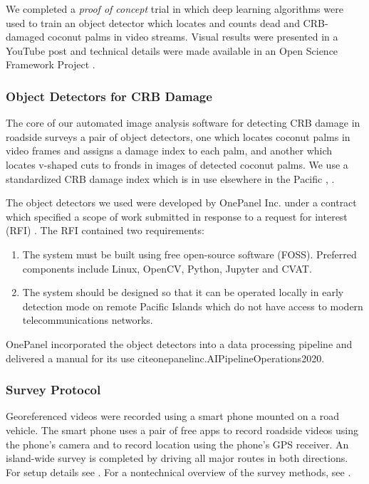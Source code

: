 \documentclass[12pt,letterpaper,english,bibliography=totocnumbered,abstract=on]{scrartcl}
\begin{document}
We completed a \textit{proof of concept} trial in which deep learning algorithms were used to train an object detector which locates and counts dead and CRB-damaged coconut palms in video streams.  Visual results were presented in a YouTube post \parencite{moore_training_2019} and technical details were made available in an Open Science Framework Project \parencite{moore_open_2019}.

\subsubsection{Object Detectors for CRB Damage}

The core of our automated image analysis software for detecting CRB damage in roadside surveys a pair of object detectors, one which locates coconut palms in video frames and assigns a damage index to each palm, and another which locates v-shaped cuts to fronds in images of detected coconut palms. We use a standardized CRB damage index which is in use elsewhere in the Pacific \cite{jackson_rhinoceros_2019-1}, \cite{vaqalo_coconut_2017}.

The object detectors we used were developed by OnePanel Inc. under a contract which specified a scope of work \cite{onepanelinc.ScopeWorkObject2020} submitted in response to a request for interest (RFI) \cite{mooreRequestInterestObject2020}. The RFI contained two requirements:
\begin{enumerate}
	\item The system must be built using free open-source software (FOSS). Preferred components include Linux, OpenCV, Python, Jupyter and CVAT.
	\item The system should be designed so that it can be operated locally in early detection
	mode on remote Pacific Islands which do not have access to modern telecommunications networks.
\end{enumerate}
OnePanel incorporated the object detectors into a data processing pipeline and delivered a manual for its use cite{onepanelinc.AIPipelineOperations2020}.

\subsubsection{Survey Protocol}

Georeferenced videos were recorded using a smart phone mounted on a road vehicle. The smart phone uses a pair of free apps to record roadside videos using the phone's camera and to record location using the phone's GPS receiver. An island-wide survey is completed by driving all major routes in both directions.  For setup details see \cite{aubreymooreSetAutomatedRoadside2020}. For a nontechnical overview of the survey methods, see \cite{mooreUsingCellPhone2020}. 
\end{document}
